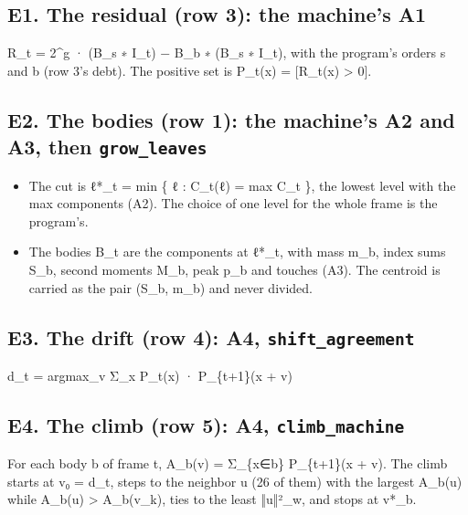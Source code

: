 \subsection{\texorpdfstring{E1. The residual (row 3): the machine's A1}{E1. The residual (row 3): the machine's A1}}

R\_\allowbreak{}t = 2\textasciicircum{}g · (B\_\allowbreak{}s ∗ I\_\allowbreak{}t) − B\_\allowbreak{}b ∗ (B\_\allowbreak{}s ∗ I\_\allowbreak{}t), with the program's orders s and b (row 3's debt). The positive set is P\_\allowbreak{}t(x) = [R\_\allowbreak{}t(x) > 0].

\subsection{\texorpdfstring{E2. The bodies (row 1): the machine's A2 and A3, then \texttt{grow\_\allowbreak{}leaves}}{E2. The bodies (row 1): the machine's A2 and A3, then grow\_leaves}}

\begin{itemize}
\item The cut is ℓ*\_\allowbreak{}t = min \{ ℓ : C\_\allowbreak{}t(ℓ) = max C\_\allowbreak{}t \}, the lowest level with the max components (A2). The choice of one level for the whole frame is the program's.
\item The bodies B\_\allowbreak{}t are the components at ℓ*\_\allowbreak{}t, with mass m\_\allowbreak{}b, index sums S\_\allowbreak{}b, second moments M\_\allowbreak{}b, peak p\_\allowbreak{}b and touches (A3). The centroid is carried as the pair (S\_\allowbreak{}b, m\_\allowbreak{}b) and never divided.
\end{itemize}

\subsection{\texorpdfstring{E3. The drift (row 4): A4, \texttt{shift\_\allowbreak{}agreement}}{E3. The drift (row 4): A4, shift\_agreement}}

d\_\allowbreak{}t = argmax\_\allowbreak{}v Σ\_\allowbreak{}x P\_\allowbreak{}t(x) · P\_\allowbreak{}\{t+1\}(x + v)

\subsection{\texorpdfstring{E4. The climb (row 5): A4, \texttt{climb\_\allowbreak{}machine}}{E4. The climb (row 5): A4, climb\_machine}}

For each body b of frame t, A\_\allowbreak{}b(v) = Σ\_\allowbreak{}\{x∈b\} P\_\allowbreak{}\{t+1\}(x + v). The climb starts at v₀ = d\_\allowbreak{}t, steps to the neighbor u (26 of them) with the largest A\_\allowbreak{}b(u) while A\_\allowbreak{}b(u) > A\_\allowbreak{}b(v\_\allowbreak{}k), ties to the least ‖u‖²\_\allowbreak{}w, and stops at v*\_\allowbreak{}b.

